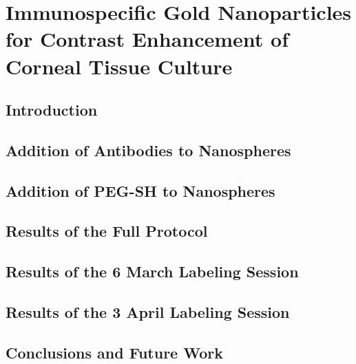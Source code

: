 
\def\mytitle{Theo DuBose Thesis}

\def\bibliocommand{}
\part{Immunospecific Gold Nanoparticles for Contrast Enhancement of Corneal Tissue Culture}
\label{immunospecificgoldnanoparticlesforcontrastenhancementofcornealtissueculture}

\chapter{Introduction}
\label{introduction}


\newpage
\chapter{Addition of Antibodies to Nanospheres}
\label{additionofantibodiestonanospheres}


\newpage
\chapter{Addition of PEG-SH to Nanospheres}
\label{additionofpeg-shtonanospheres}


\newpage
\chapter{Results of the Full Protocol}
\label{resultsofthefullprotocol}


\newpage
\chapter{Results of the 6 March Labeling Session}
\label{resultsofthe6marchlabelingsession}


\newpage
\chapter{Results of the 3 April Labeling Session}
\label{resultsofthe3aprillabelingsession}



\newpage
\chapter{Conclusions and Future Work}
\label{conclusionsandfuturework}



\newpage



